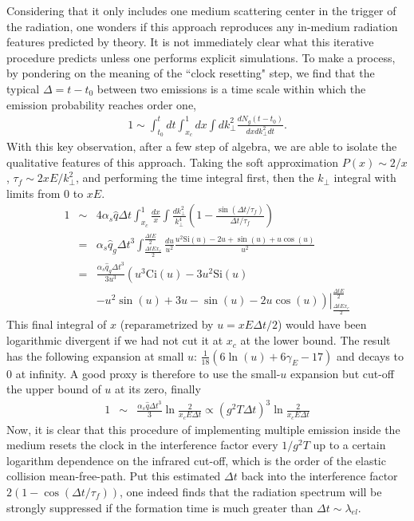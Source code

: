Considering that it only includes one medium scattering center in the trigger of the radiation, one wonders if this approach reproduces any in-medium radiation features predicted by theory.
It is not immediately clear what this iterative procedure predicts unless one performs explicit simulations. 
To make a process, by pondering on the meaning of the ``clock resetting" step, we find that the typical $\Delta = t-t_0$ between two emissions is a time scale within which the emission probability reaches order one,
\begin{eqnarray}
1 \sim \int_{t_0}^{t} dt\int_{x_c}^1 dx \int dk_\perp^2 \frac{dN_g(t-t_0)}{dx dk_\perp^2 dt}.
\end{eqnarray}
With this key observation, after a few step of algebra, we are able to isolate the qualitative features of this approach.
Taking the soft approximation $P(x) \sim 2/x$, $\tau_f\sim 2xE/k_\perp^2$, and performing the time integral first, then the $k_\perp$ integral with limits from $0$ to $xE$.
\begin{eqnarray}
1 &\sim& 4\alpha_s\hat{q}\Delta t \int_{x_c}^1 \frac{dx}{x} \int \frac{dk_\perp^2}{k_\perp^4}\left(1-\frac{\sin(\Delta t/\tau_f)}{\Delta t/\tau_f}\right)\\
&=& \alpha_s\hat{q}_g \Delta t^3 \int_{\frac{\Delta t E x_c}{2}}^{\frac{\Delta t E}{2}} 
\frac{du}{u^2} \frac{u^2 \mathrm{Si}(u) -2u + \sin(u) + u\cos(u)}{u^2}\\
&=& \frac{\alpha_s\hat{q}_g \Delta t^3}{3u^3} \left(
u^3\mathrm{Ci}(u)-3u^2\mathrm{Si}(u) \right.\\\nonumber
&&\left.\left.- u^2 \sin(u) +3u-\sin(u) - 2u\cos(u)\right)\right|_{\frac{\Delta t E x_c}{2}}^{\frac{\Delta t E}{2}} 
\end{eqnarray}
This final integral of $x$ (reparametrized by $u = xE\Delta t/2$) would have been logarithmic divergent if we had not cut it at $x_c$ at the lower bound.
The result has the following expansion at small $u$: $\frac{1}{18}(6\ln(u)+6\gamma_E - 17)$ and decays to $0$ at infinity. 
A good proxy is therefore to use the small-$u$ expansion but cut-off the upper bound of $u$ at its zero, finally
\begin{eqnarray}
1 &\sim&  \frac{\alpha_s\hat{q}\Delta t^3}{3}\ln\frac{2}{ x_c E \Delta t } \propto (g^2 T \Delta t)^3 \ln\frac{2}{ x_c E \Delta t }
\end{eqnarray}
Now, it is clear that this procedure of implementing multiple emission inside the medium resets the clock in the interference factor every $1/g^2T$ up to a certain logarithm dependence on the infrared cut-off, which is the order of the elastic collision mean-free-path.
Put this estimated $\Delta t$ back into the interference factor $2(1-\cos(\Delta t/\tau_f))$, one indeed finds that the radiation spectrum will be strongly suppressed if the formation time is much greater than $\Delta t\sim \lambda_{el}$.

